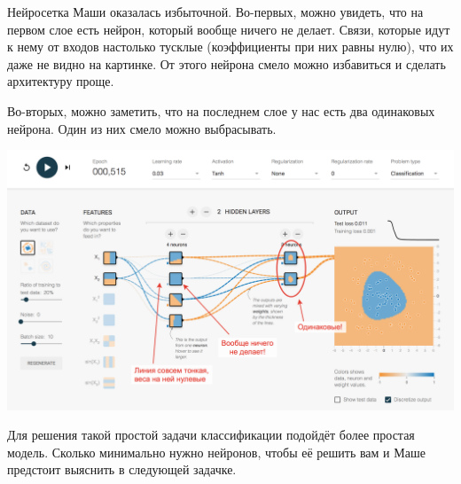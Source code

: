 \documentclass[12pt, a4paper, oneside]{article}
\theoremstyle{plain} %
\theoremstyle{definition}
\begin{document}
\begin{sol}
Нейросетка Маши оказалась избыточной. Во-первых, можно увидеть, что на первом слое есть нейрон, который вообще ничего не делает. Связи, которые идут к нему от входов настолько тусклые (коэффициенты при них равны нулю), что их даже не видно на картинке. От этого нейрона смело можно избавиться и сделать архитектуру проще. 

Во-вторых, можно заметить, что на последнем слое у нас есть два одинаковых нейрона. Один из них смело можно выбрасывать. 

\begin{center} 
\includegraphics[scale=0.17]{tensorflow_demo2.png}
\end{center} 


Для решения такой простой задачи классификации подойдёт более простая модель. Сколько минимально нужно нейронов, чтобы её решить вам и Маше предстоит выяснить в следующей задачке. 
\end{sol}
\end{document}
